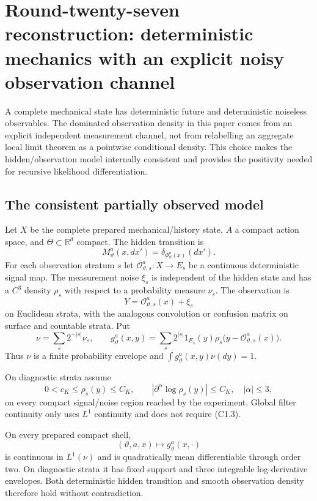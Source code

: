 
\section{Round-twenty-seven reconstruction: deterministic mechanics with an explicit noisy observation channel}
\label{sec:r27-c1}

A complete mechanical state has deterministic future and deterministic
noiseless observables.  The dominated observation density in this paper comes
from an explicit independent measurement channel, not from relabelling an
aggregate local limit theorem as a pointwise conditional density.  This
choice makes the hidden/observation model internally consistent and provides
the positivity needed for recursive likelihood differentiation.

\subsection{The consistent partially observed model}

Let $X$ be the complete prepared mechanical/history state, $A$ a compact
action space, and $\Theta\subset\mathbb R^d$ compact.  The hidden transition is
\[
 M_\vartheta^a(x,dx')
 =\delta_{\Phi_\vartheta^a(x)}(dx').                      \tag{C1.1}
\]
For each observation stratum $s$ let
$\mathcal O_{\vartheta,s}^a:X\to E_s$ be a continuous deterministic signal
map.  The measurement noise $\xi_s$ is independent of the hidden state and
has a $C^3$ density $\rho_s$ with respect to a probability measure $\nu_s$.
The observation is
\[
 Y=\mathcal O_{\vartheta,s}^a(x)+\xi_s
\]
on Euclidean strata, with the analogous convolution or confusion matrix on
surface and countable strata.  Put
\[
 \nu=\sum_s2^{-|s|}\nu_s,\qquad
 g_\vartheta^a(x,y)
 =\sum_s2^{|s|}1_{E_s}(y)
   \rho_s\bigl(y-\mathcal O_{\vartheta,s}^a(x)\bigr).      \tag{C1.2}
\]
Thus $\nu$ is a finite probability envelope and
$\int g_\vartheta^a(x,y)\nu(dy)=1$.

On diagnostic strata assume
\[
 0<c_K\le\rho_s(y)\le C_K,\qquad
 |\partial^\alpha\log\rho_s(y)|\le C_K,\quad|\alpha|\le3,               \tag{C1.3}
\]
on every compact signal/noise region reached by the experiment.  Global
filter continuity only uses $L^1$ continuity and does not require (C1.3).

\begin{proposition}
\label{prop:r27-c1-channel}
On every prepared compact shell,
\[
 (\vartheta,a,x)\longmapsto g_\vartheta^a(x,\cdot)
\]
is continuous in $L^1(\nu)$ and is quadratically mean differentiable through
order two.  On diagnostic strata it has fixed support and three integrable
log-derivative envelopes.  Both deterministic hidden transition and smooth
observation density therefore hold without contradiction.
\end{proposition}

